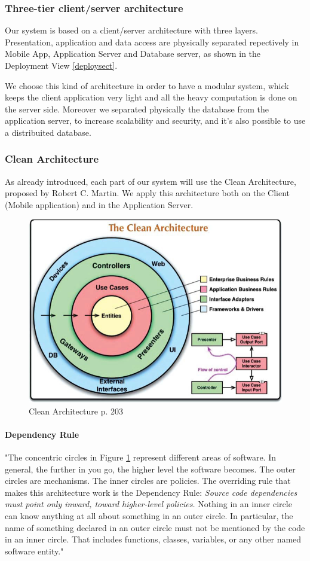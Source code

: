 \subsubsection{Three-tier client/server architecture}
Our system is based on a client/server architecture with three layers.
Presentation, application and data access are physically separated repectively in Mobile App, Application Server and Database server, as shown in the Deployment View \ref{deploysect}.

We choose this kind of architecture in order to have a modular system, whick keeps the client application very light and all the heavy computation is done on the server side. Moreover we separated physically the database from the application server, to increase scalability and security, and it's also possible to use a distribuited database.


\subsubsection{Clean Architecture}
As already introduced, each part of our system will use the Clean Architecture, proposed by Robert C. Martin. We apply this architecture both on the Client (Mobile application) and in the Application Server.

\begin{figure}[H]
\centering
\includegraphics[width=.7\textwidth]{Images/cleanArchi.pdf}
\caption{\label{fig:cleanArchi} Clean Architecture \cite{clean} p. 203}
\end{figure}

\paragraph{Dependency Rule}
"The concentric circles in Figure \ref{fig:cleanArchi} represent different areas of software. In general, the further in you go, the higher level the software becomes. The outer circles are mechanisms. The inner circles are policies.
The overriding rule that makes this architecture work is the Dependency Rule:
\textit{Source code dependencies must point only inward, toward higher-level policies.}
Nothing in an inner circle can know anything at all about something in an outer circle. In particular, the name of something declared in an outer circle must not be mentioned by the code in an inner circle. That includes functions, classes, variables, or any other named software entity." \cite{clean}

